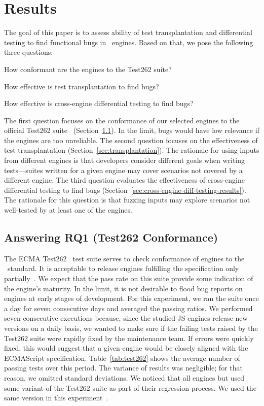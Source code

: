 \documentclass[smallextended]{svjour3}
\begin{document}
\section{Results}
\label{sec:results}

The goal of this paper is to assess ability of
test transplantation and differential testing
to find functional bugs
in \javascript\ engines. Based on that, we pose the following three questions:
\begin{description}[leftmargin=.5in]
\item[RQ1.] How conformant are the engines to the Test262 suite?
\item[RQ2.] How effective is test transplantation to find bugs?
\item[RQ3.] How effective is cross-engine differential testing to find bugs?
\end{description}

The first question focuses on the conformance of our selected engines
to the official Test262 suite~\cite{ecma262-conformance-suite}
(Section~\ref{sec:stability}). In the limit, bugs would have low
relevance if the engines are too unreliable. The second question
focuses on the effectiveness of test transplantation
(Section~\ref{sec:transplantation}). The rationale for using inputs
from different engines is that developers consider different goals
when writing tests---suites written for a given engine may cover
scenarios not covered by a different engine. The third question
evaluates the effectiveness of cross-engine differential testing to
find bugs (Section~\ref{sec:cross-engine-diff-testing-results}). The
rationale for this question is that fuzzing inputs may explore
scenarios not well-tested by at least one of the engines.

\subsection{Answering RQ1 (Test262 Conformance)}
\label{sec:stability}

The ECMA Test262~\cite{ecma262-conformance-suite} test suite serves to
check conformance of engines to the \js\ standard. It is
acceptable to release engines fulfilling the specification only
partially~\cite{kangax}. We expect that the pass rate on this suite
provide some indication of the engine's maturity. In the limit, it is
not desirable to flood bug reports on engines at early stages of
development.
For this experiment, we ran the suite once a day for seven consecutive
days and averaged the passing ratios.
We performed seven consecutive executions because,
since the studied JS engines release new versions on a daily basis,
we wanted to make sure if the failing tests raised by the Test262 suite
were rapidly fixed by the maintenance team. If errors were quickly
fixed, this would suggest that a given engine would be closely aligned with
the ECMAScript specification.
Table~\ref{tab:test262} shows
the average number of passing tests over this period. The variance of
results was negligible; for that reason, we omitted standard
deviations. We noticed that all engines but \chakra used some
variant of the Test262 suite as part of their regression process.
We used the same version in this
experiment~\cite{ecma262-conformance-suite}.
\end{document}
